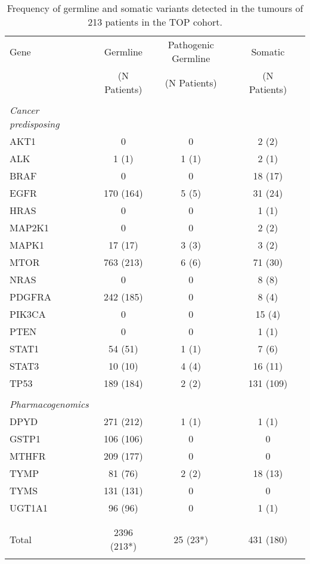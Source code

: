 \documentclass{bmcart}
\begin{document}
\begin{table}[htb]
\caption{Frequency of germline and somatic variants detected in the tumours of 213 patients in the TOP cohort.}\label{metrics}
\centering
\begin{tabular}{lcclcl}
        \hline
        Gene & Germline & Pathogenic Germline && Somatic \\
				 & (N Patients) & (N Patients) && (N Patients) \\
				\hline
				\\
				\multicolumn{1}{l}{\textit{Cancer predisposing}}
				&
				\multicolumn{2}{l}{ }
				&&
				\multicolumn{1}{l}{} \\
				\hline
				AKT1 & 0 & 0 && 2 (2) \\
				\arrayrulecolor{evagrey}\hline
				ALK & 1 (1) & 1 (1) && 2 (1) \\
				\hline
				BRAF & 0 & 0 && 18 (17) \\
				\hline
				EGFR & 170 (164) & 5 (5) && 31 (24) \\
				\hline
				HRAS & 0 & 0 && 1 (1) \\
				\hline
				MAP2K1 & 0 & 0 && 2 (2) \\
				\hline
				MAPK1 & 17 (17) & 3 (3) && 3 (2) \\
				\hline
				MTOR & 763 (213) & 6 (6) && 71 (30) \\
				\hline
				NRAS & 0 & 0 && 8 (8) \\
				\hline
				PDGFRA & 242 (185) & 0 && 8 (4) \\
				\hline
				PIK3CA & 0 & 0 && 15 (4) \\
				\hline
				PTEN & 0 & 0 && 1 (1) \\
				\hline
				STAT1 & 54 (51) & 1 (1) && 7 (6) \\
				\hline
				STAT3 & 10 (10) & 4 (4) && 16 (11) \\
				\hline
				TP53 & 189 (184) & 2 (2) && 131 (109) \\
				\arrayrulecolor{black}\hline
				\\
				\multicolumn{1}{l}{\textit{Pharmacogenomics}}
				&
				\multicolumn{2}{l}{ }
				&&
				\multicolumn{1}{l}{} \\
				\arrayrulecolor{black}\hline
				DPYD & 271 (212) & 1 (1) && 1 (1) \\
				\arrayrulecolor{evagrey}\hline
				GSTP1 & 106 (106) & 0 && 0 \\
				\hline
				MTHFR & 209 (177) & 0 && 0 \\
				\hline
				TYMP & 81 (76) & 2 (2) && 18 (13)\\
				\hline
				TYMS & 131 (131) & 0 && 0 \\
				\hline
				UGT1A1 & 96 (96) & 0 && 1 (1) \\
				\arrayrulecolor{black}\hline \\
				\\
				Total & 2396 (213*) & 25 (23*) && 431 (180) \\
				\arrayrulecolor{black}\hline
      \end{tabular}
\end{table}
\end{document}
